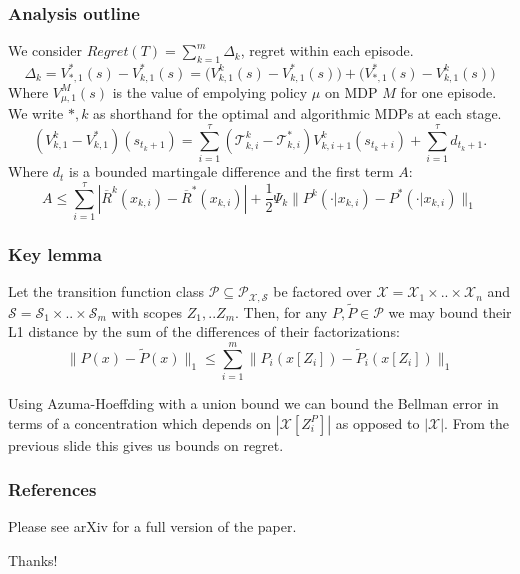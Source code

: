 \documentclass{beamer}
\newcommand{\Xc}{\mathcal{X}}
\newcommand{\Pc}{\mathcal{P}}
\newcommand{\Sc}{\mathcal{S}}
\newcommand{\Tc}{\mathcal{T}}
\begin{document}
\begin{frame}
\frametitle{Analysis outline}
\small
We consider $Regret(T) = \sum_{k=1}^m \Delta_k$, regret within each episode.
\begin{equation}
	\Delta_k =  V^*_{*,1}(s) - V^*_{k,1}(s) = \bigg( V^k_{k,1}(s) - V^*_{k,1}(s) \bigg) + \bigg(V^*_{*,1}(s) - V^k_{k,1}(s) \bigg)
\end{equation}
Where $V^M_{\mu,1}(s)$ is the value of empolying policy $\mu$ on MDP $M$ for one episode.
We write $*,k$ as shorthand for the optimal and algorithmic MDPs at each stage.
\small
\begin{equation}
	\left(V^k_{k,1} - V^*_{k,1} \right) (s_{t_k+1}) = \sum_{i=1}^\tau \left( \Tc^k_{k,i} - \Tc^*_{k,i} \right) V^k_{k,i+1}(s_{t_k+i}) + \sum_{i=1}^\tau d_{t_k+1}.
\end{equation}
Where $d_t$ is a bounded martingale difference and the first term $A$:
\begin{equation}
\label{eq: err sums}
	A \le \sum_{i=1}^\tau |\overline{R}^k(x_{k,i}) - \overline{R}^*(x_{k,i}) | +
	\frac{1}{2} \Psi_k \|P^k(\cdot|x_{k,i}) - P^*(\cdot|x_{k,i}) \|_1
\end{equation}
\end{frame}


\begin{frame}
\frametitle{Key lemma}
\begin{lemma}
\label{lem: factor bound} \hspace{0.000000001mm} \newline
Let the transition function class $\Pc \subseteq \Pc_{\Xc,\Sc}$ be factored over $\Xc = \Xc_1 \times .. \times \Xc_n$ and $\Sc = \Sc_1 \times .. \times \Sc_m$ with scopes  $Z_1, .. Z_m$.
Then, for any $P,\tilde{P} \in \Pc$ we may bound their L1 distance by the sum of the differences of their factorizations:
$$ \| P(x) - \tilde{P}(x) \|_1 \le \sum_{i=1}^m \|P_i(x[Z_i]) - \tilde{P}_i(x[Z_i]) \|_1 $$
\end{lemma}

Using Azuma-Hoeffding with a union bound we can bound the Bellman error in terms of a concentration which depends on $|\Xc[Z_i^P]|$ as opposed to $|\Xc|$.
From the previous slide this gives us bounds on regret.
\end{frame}

\begin{frame}
\frametitle{References}
\centering
Please see arXiv for a full version of the paper.
\vspace{1cm}

\pause
Thanks!
\end{frame}
\end{document}

